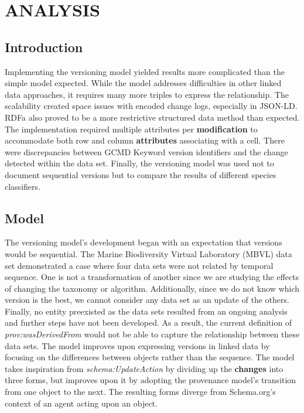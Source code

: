 
\chapter{ANALYSIS}

\section{Introduction}

Implementing the versioning model yielded results more complicated than the simple model expected.
While the model addresses difficulties in other linked data approaches, it requires many more triples to express the relationship.
The scalability created space issues with encoded change logs, especially in JSON-LD.
RDFa also proved to be a more restrictive structured data method than expected.
The implementation required multiple attributes per \textbf{modification} to accommodate both row and column \textbf{attributes} associating with a cell.
There were discrepancies between GCMD Keyword version identifiers and the change detected within the data set.
Finally, the versioning model was used not to document sequential versions but to compare the results of different species classifiers.

\section{Model}

The versioning model's development began with an expectation that versions would be sequential.
The Marine Biodiversity Virtual Laboratory (MBVL) data set demonstrated a case where four data sets were not related by temporal sequence.
One is not a transformation of another since we are studying the effects of changing the taxonomy or algorithm.
Additionally, since we do not know which version is the best, we cannot consider any data set as an update of the others.
Finally, no entity preexisted as the data sets resulted from an ongoing analysis and further steps have not been developed.
As a result, the current definition of \textit{prov:wasDerivedFrom} would not be able to capture the relationship between these data sets.
The model improves upon expressing versions in linked data by focusing on the differences between objects rather than the sequence.
The model takes inspiration from \textit{schema:UpdateAction} by dividing up the \textbf{changes} into three forms, but improves upon it by adopting the provenance model's transition from one object to the next.
The resulting forms diverge from Schema.org's context of an agent acting upon an object.

